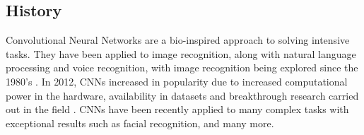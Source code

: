 \tocless\subsection{History}
Convolutional Neural Networks are a bio-inspired approach to solving intensive tasks.
They have been applied to image recognition, along with natural language processing and voice recognition, with image recognition being explored since the 1980's \parencite{handsOnML}.
In 2012, CNNs increased in popularity due to increased computational power in the hardware, availability in datasets and breakthrough research carried out in the field \parencite{krizhevsky2012imagenet}.
CNNs have been recently applied to many complex tasks with exceptional results such as facial recognition, and many more.